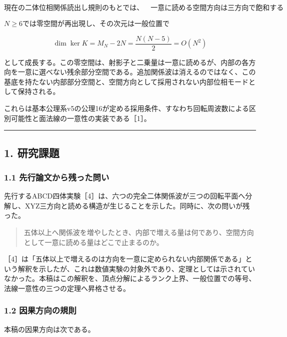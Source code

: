 \documentclass[
  a4paper,
]{ltjsarticle}
\begin{document}
\[
\boxed{
\text{現在の二体位相関係読出し規則のもとでは、}
\quad
\text{一意に読める空間方向は三方向で飽和する}
}
\]

\(N\ge6\)では零空間が再出現し、その次元は一般位置で

\[
\dim\ker K=M_N-2N=\frac{N(N-5)}{2}=O(N^2)
\]

として成長する。この零空間は、射影子と二乗量は一意に読めるが、内部の各方向を一意に選べない残余部分空間である。追加関係波は消えるのではなく、この基底を持たない内部部分空間と、空間方向として採用されない内部位相モードとして保持される。

これらは基本公理系v5の公理16が定める採用条件、すなわち回転周波数による区別可能性と面法線の一意性の実装である［1］。

\begin{center}\rule{0.5\linewidth}{0.5pt}\end{center}

\subsection{1. 研究課題}\label{ux7814ux7a76ux8ab2ux984c}

\subsubsection{1.1
先行論文から残った問い}\label{ux5148ux884cux8ad6ux6587ux304bux3089ux6b8bux3063ux305fux554fux3044}

先行するABCD四体実験［4］は、六つの完全二体関係波が三つの回転平面へ分解し、XYZ三方向と読める構造が生じることを示した。同時に、次の問いが残った。

\begin{quote}
五体以上へ関係波を増やしたとき、内部で増える量は何であり、空間方向として一意に読める量はどこで止まるのか。
\end{quote}

［4］は「五体以上で増えるのは方向を一意に定められない内部関係である」という解釈を示したが、これは数値実験の対象外であり、定理としては示されていなかった。本稿はこの解釈を、頂点分解によるランク上界、一般位置での等号、法線一意性の三つの定理へ昇格させる。

\subsubsection{1.2
因果方向の規則}\label{ux56e0ux679cux65b9ux5411ux306eux898fux5247}

本稿の因果方向は次である。
\end{document}
